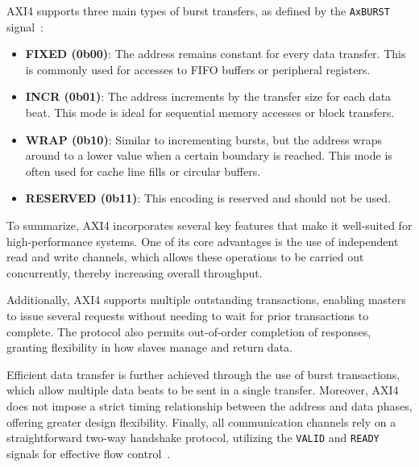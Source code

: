 AXI4 supports three main types of burst transfers, as defined by the \texttt{AxBURST} signal~\cite{arm_ltd_introduction_2020}:

\begin{itemize}
    \item \textbf{FIXED (0b00)}: The address remains constant for every data transfer. This is commonly used for accesses to FIFO buffers or peripheral registers.
    \item \textbf{INCR (0b01)}: The address increments by the transfer size for each data beat. This mode is ideal for sequential memory accesses or block transfers.
    \item \textbf{WRAP (0b10)}: Similar to incrementing bursts, but the address wraps around to a lower value when a certain boundary is reached. This mode is often used for cache line fills or circular buffers.
    \item \textbf{RESERVED (0b11)}: This encoding is reserved and should not be used.
\end{itemize}
\fi

To summarize, AXI4 incorporates several key features that make it well-suited for high-performance systems. One of its core advantages is the use of independent read and write channels, which allows these operations to be carried out concurrently, thereby increasing overall throughput. 

Additionally, AXI4 supports multiple outstanding transactions, enabling masters to issue several requests without needing to wait for prior transactions to complete. The protocol also permits out-of-order completion of responses, granting flexibility in how slaves manage and return data. 

Efficient data transfer is further achieved through the use of burst transactions, which allow multiple data beats to be sent in a single transfer. Moreover, AXI4 does not impose a strict timing relationship between the address and data phases, offering greater design flexibility. Finally, all communication channels rely on a straightforward two-way handshake protocol, utilizing the \texttt{VALID} and \texttt{READY} signals for effective flow control~\cite{st_micheal_introduction_2019, the_art_of_verification_understanding_2021}.


